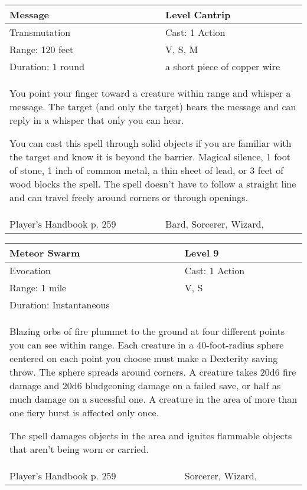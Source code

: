 \documentclass[11pt]{report}
\begin{document}
\begin{table}[H]
	\begin{tabular}{||p{6cm}|p{6cm}||}
		\hline\hline
		\bf{Message} & Level Cantrip\\ \hline
		Transmutation & Cast: 1 Action\\ \hline
		Range: 120 feet & V, S, M\\ \hline
		Duration: 1 round & a short piece of copper wire\\ \hline
		\multicolumn{2}{||p{12cm}||}{You point your finger toward a creature within range and whisper a message.
The target (and only the target) hears the message and can reply in a whisper that only you can hear.

You can cast this spell through solid objects if you are familiar with the target and know it is beyond the barrier. Magical silence, 1 foot of stone, 1 inch of common metal, a thin sheet of lead, or 3 feet of wood blocks the spell. The spell doesn’t have to follow a straight line and can travel freely around corners or through openings.}\\ \hline
Player's Handbook p. 259 & Bard, Sorcerer, Wizard, \\ \hline\hline
	\end{tabular}
\end{table}

\begin{table}[H]
	\begin{tabular}{||p{6cm}|p{6cm}||}
		\hline\hline
		\bf{Meteor Swarm} & Level 9\\ \hline
		Evocation & Cast: 1 Action\\ \hline
		Range: 1 mile & V, S\\ \hline
		Duration: Instantaneous & \\ \hline
		\multicolumn{2}{||p{12cm}||}{Blazing orbs of fire plummet to the ground at four different points you can see within range.
Each creature in a 40-foot-radius sphere centered on each point you choose must make a Dexterity saving throw. The sphere spreads around corners. A creature takes 20d6 fire damage and 20d6 bludgeoning damage on a failed save, or half as much damage on a sucessful one. A creature in the area of more than one fiery burst is affected only once.

The spell damages objects in the area and ignites flammable objects that aren’t being worn or carried.}\\ \hline
Player's Handbook p. 259 & Sorcerer, Wizard, \\ \hline\hline
	\end{tabular}
\end{table}
\end{document}

